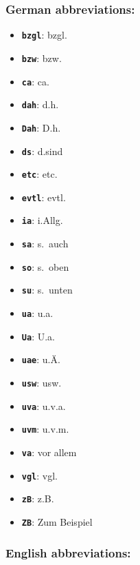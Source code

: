 \documentclass[english]{hgbarticle}
\begin{document}
\subsubsection*{German abbreviations:}

\begin{itemize}
    \item \textbf{\texttt{{\bs}bzgl}}: bzgl.
    \item \textbf{\texttt{{\bs}bzw}}: bzw.
    \item \textbf{\texttt{{\bs}ca}}: ca.
    \item \textbf{\texttt{{\bs}dah}}: d.\thinspace{}h.
    \item \textbf{\texttt{{\bs}Dah}}: D.\thinspace{}h.
    \item \textbf{\texttt{{\bs}ds}}: d.\thinspace{}sind
    \item \textbf{\texttt{{\bs}etc}}: etc.
    \item \textbf{\texttt{{\bs}evtl}}: evtl.
    \item \textbf{\texttt{{\bs}ia}}: i.\thinspace{}Allg.
    \item \textbf{\texttt{{\bs}sa}}: s.\ auch
    \item \textbf{\texttt{{\bs}so}}: s.\ oben
    \item \textbf{\texttt{{\bs}su}}: s.\ unten
    \item \textbf{\texttt{{\bs}ua}}: u.\thinspace{}a.
    \item \textbf{\texttt{{\bs}Ua}}: U.\thinspace{}a.
    \item \textbf{\texttt{{\bs}uae}}: u.\thinspace{}\"A.
    \item \textbf{\texttt{{\bs}usw}}: usw.
    \item \textbf{\texttt{{\bs}uva}}: u.\thinspace{}v.\thinspace{}a.
    \item \textbf{\texttt{{\bs}uvm}}: u.\thinspace{}v.\thinspace{}m.
    \item \textbf{\texttt{{\bs}va}}: vor allem
    \item \textbf{\texttt{{\bs}vgl}}: vgl.
    \item \textbf{\texttt{{\bs}zB}}: z.\thinspace{}B.
    \item \textbf{\texttt{{\bs}ZB}}: Zum Beispiel
\end{itemize}

\subsubsection*{English abbreviations:}
\end{document}
